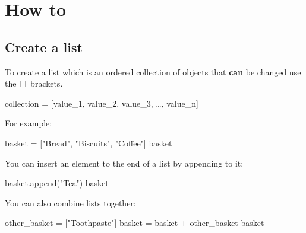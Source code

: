 \section{How to}
\label{\detokenize{tools-for-mathematics/06-probability/how/main:how-to}}\label{\detokenize{tools-for-mathematics/06-probability/how/main::doc}}

\subsection{Create a list}
\label{sec:create_a_list}

To create a list which is an ordered collection of objects that \textbf{can} be
changed use the \texttt{{[}{]}} brackets.


\begin{pyin}
collection = [value_1, value_2, value_3, …, value_n]
\end{pyin}



For example:




\begin{pyin}
basket = ["Bread", "Biscuits", "Coffee"]
basket
\end{pyin}





\begin{raw}
\end{raw}





You can insert an element to the end of a list by appending to it:




\begin{pyin}
basket.append("Tea")
basket
\end{pyin}





\begin{raw}
\end{raw}





You can also combine lists together:




\begin{pyin}
other_basket = ["Toothpaste"]
basket = basket + other_basket
basket
\end{pyin}





